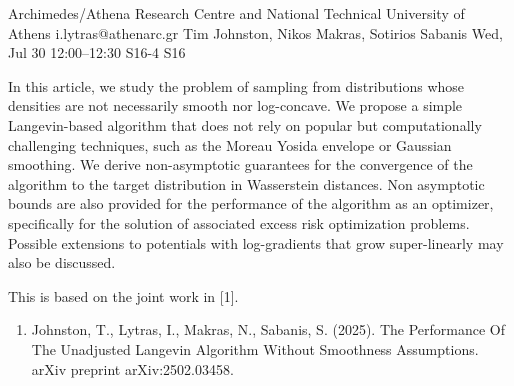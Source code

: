 \documentclass[12pt,lettersize,oneside]{book} %
\begin{document}
\begin{talk}
  {Archimedes/Athena Research Centre and National Technical University of Athens}%
  {i.lytras@athenarc.gr}%
  {Tim Johnston, Nikos Makras, Sotirios Sabanis}%
  {}%
  {}%
  {}%
  {Wed, Jul 30 12:00--12:30}%
  {S16-4}%
  {S16}%
  
    
   
In this article, we study the problem of sampling from distributions whose densities are not necessarily smooth nor log-concave. We propose a simple Langevin-based algorithm that does not rely on popular but computationally challenging techniques, such as the Moreau Yosida envelope or Gaussian smoothing. We derive non-asymptotic guarantees for the convergence of the algorithm to the target distribution in Wasserstein distances. Non asymptotic bounds are also provided for the performance of the algorithm as an optimizer, specifically for the solution of associated excess risk optimization problems.\\
Possible extensions to potentials with log-gradients that grow super-linearly may also be discussed.

This is based on the joint work in [1].
\medskip

\begin{enumerate}
    \item [{[1]}] Johnston, T., Lytras, I., Makras, N., Sabanis, S. (2025). The Performance Of The Unadjusted Langevin Algorithm Without Smoothness Assumptions. arXiv preprint arXiv:2502.03458.
\end{enumerate}
\end{talk}
\end{document}
